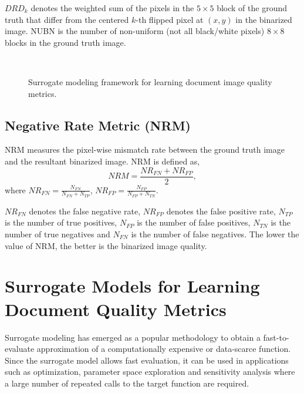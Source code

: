 \documentclass[10pt, a4paper, conference, compsocconf]{IEEEtran}
\begin{document}
$DRD_k$ denotes the weighted sum of the pixels in the $5 \times 5$ block of the ground truth that differ from the centered $k$-th flipped pixel at $(x,y)$ in the binarized image. NUBN is the number of non-uniform (not all black/white pixels) $8 \times 8$ blocks in the ground truth image. 

\begin{figure*}[!t]
  \centering
\\
\caption{Surrogate modeling framework for learning document image quality metrics.}
\label{fig_model}
\end{figure*}

\subsection{Negative Rate Metric (NRM)}
NRM measures the pixel-wise mismatch rate between the ground truth image and the resultant binarized image. NRM is defined as,
\begin{equation} 
NRM = \frac{NR_{FN} + NR_{FP}}{2},
\label{eq_nrm}
\end{equation}
where $NR_{FN}=\frac{N_{FN}}{N_{FN} + N_{TP}}$, $NR_{FP}=\frac{N_{FP}}{N_{FP} + N_{TN}}$. \newline

\noindent $NR_{FN}$ denotes the false negative rate, $NR_{FP}$ denotes the false positive rate, $N_{TP}$ is the number of true positives, $N_{FP}$ is the number of false positives, $N_{TN}$ is the number of true negatives and $N_{FN}$ is the number of false negatives. The lower the value of NRM, the better is the binarized image quality. 


\section{Surrogate Models for Learning Document Quality Metrics}
\label{surrogate}
Surrogate modeling \cite{gorissen2010surrogate} has emerged as a popular methodology to obtain a fast-to-evaluate approximation of a computationally expensive or data-scarce function. Since the surrogate model allows fast evaluation, it can be used in applications such as optimization, parameter space exploration and sensitivity analysis where a large number of repeated calls to the target function are required. 
\end{document}
